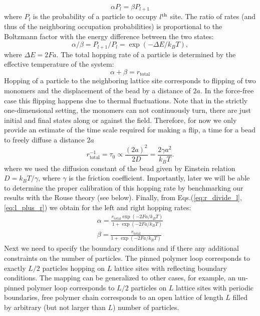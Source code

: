 \documentclass[aps,showpacs,twocolumn,floatfix,prx,superscriptaddress]{revtex4-1}
\begin{document}
\begin{equation}
    \alpha P_{l} = \beta P_{l+1} \label{eq:db}
\end{equation}
where $P_{l}$ is the probability of a particle to occupy $l^{\rm{th}}$ site. The ratio of rates (and thus of the neighboring occupation probabilities) is proportional to the Boltzmann factor with the energy difference between the two states:
\begin{equation}
    \alpha / \beta = P_{l+1} / P_{l} = \exp{(-\Delta E / k_B T)},  \label{eq:r_divide_l}
\end{equation}
where  $\Delta E = 2Fa$.  The total hopping rate of a particle is determined by the effective temperature of the system: 
\begin{equation}
    \alpha + \beta = r_{\text{total}} \label{eq:l_plus_r}
\end{equation}
Hopping of a particle to the neighboring lattice site corresponds to flipping of two monomers and the displacement of the bead by a distance of $2a$. In the force-free case this flipping happens due to thermal fluctuations. Note that in the strictly one-dimensional setting, the monomers can not continuously turn, there are just initial and final states along or against the field. Therefore, for now we only provide an estimate of the time scale required for making a flip, a time for a bead to freely diffuse a distance $2a$ 
\begin{equation}
    \label{eq:timeScale}
    r_{\text{total}}^{-1} = \tau_0 \propto \frac{(2a)^2}{2D} = \frac{2\gamma a^2}{k_{B}T}.
\end{equation}
where we used the diffusion constant of the bead given by Einstein relation $D=k_{B}T/\gamma$, where $\gamma$ is the friction coefficient. Importantly, later we will be able to determine the proper calibration of this hopping rate by benchmarking our results with the Rouse theory (see below). 
Finally, from Eqs.(\ref{eq:r_divide_l},\ref{eq:l_plus_r}) we obtain for the left and right hopping rates:
\begin{subequations}
    \label{eq:l_and_r}
    \begin{eqnarray}
        \alpha  =   \frac{r_{\text{total}}\exp{(-2Fa / k_B T)}}{1+\exp{(-2Fa / k_B T)}} \\
        \beta  =  \frac{r_{\text{total}}}{1+\exp{(-2Fa / k_B T)}}
    \end{eqnarray}
\end{subequations}
Next we need to specify the boundary conditions and if there any additional constraints on the number of particles. The pinned polymer loop corresponds to exactly $L/2$ particles hopping on $L$
lattice sites with reflecting boundary conditions. The mapping can be generalized to other cases, for example,
an un-pinned polymer loop corresponds to $L/2$ particles on $L$ lattice sites with
periodic boundaries, free polymer chain corresponds to an open lattice of length $L$ filled by
arbitrary (but not larger than $L$) number of particles. 
\end{document}
